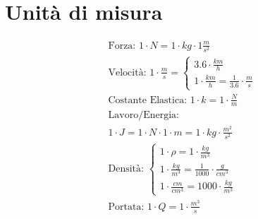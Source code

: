 \section{Unità di misura}

\begin{gather*}
  \text{Forza: } 1 \cdot N = 1 \cdot kg \cdot 1 \frac{m}{s^2} \\
  \text{Velocità: } 1 \cdot \frac{m}{s} = \begin{cases}
    3.6 \cdot \frac{km}{h} \\
1   \cdot \frac{km}{h} = \frac{1}{3.6} \cdot \frac{m}{s}
  \end{cases} \\
  \text{Costante Elastica: } 1 \cdot k = 1 \cdot \frac{N}{m} \\
  \text{Lavoro/Energia: } \\ 1 \cdot J = 1 \cdot N \cdot 1 \cdot m = 1 \cdot kg \cdot \frac{m^2}{s^2} \\
  \text{Densità: } \begin{cases}
    1 \cdot \rho = 1 \cdot \frac{kg}{m^3} \\
    1 \cdot \frac{kg}{m^3} = \frac{1}{1000} \cdot \frac{g}{cm^3} \\
    1 \cdot \frac{cm}{cm^3} = 1000 \cdot \frac{kg}{m^3}
  \end{cases} \\
  \text{Portata: } 1 \cdot Q = 1 \cdot \frac{m^3}{s}
\end{gather*}